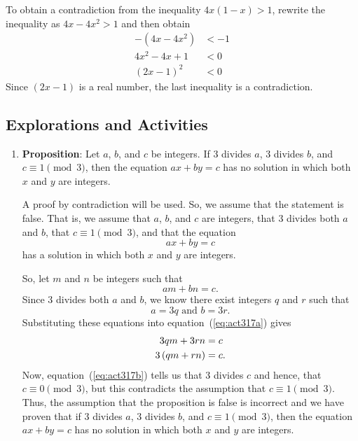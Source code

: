 \begin{enumerate}
\begin{enumerate}
\newpar
To obtain a contradiction from the inequality $4x(1 - x) > 1$, rewrite the inequality as $4x - 4x^2 > 1$ and then obtain
\begin{align*}
-\left( 4x - 4x^2 \right) &< -1 \\
4x^2 - 4x + 1 &< 0 \\
(2x - 1)^2 &< 0
\end{align*}
Since $(2x - 1)$ is a real number, the last inequality is a contradiction.
\end{enumerate}
\end{enumerate}


\subsection*{Explorations and Activities}
\setcounter{oldenumi}{\theenumi}
\begin{enumerate} \setcounter{enumi}{\theoldenumi}
\item \textbf{Proposition}: Let  $a$, $b$, and $c$  be integers.  If  3  divides  $a$,  3  divides  $b$,  and  $c \equiv 1 \pmod 3$, then the equation $ax + by = c$ has no solution in which both  $x$  and  $y$  are integers.

\begin{myproof}
A proof by contradiction will be used.  So, we assume that the statement is false.  That is, we assume that $a$, $b$, and $c$ are integers, that  3  divides both  $a$  and  $b$, that  $c \equiv 1 \pmod 3$,  and that  the equation
\[
ax + by = c
\]
has a solution in which both  $x$  and  $y$  are integers.

So, let  $m$  and  $n$  be integers  such that 
\setcounter{equation}{0}
\begin{equation} \label{eq:act317a}
am  + bn  = c.
\end{equation}
Since  3  divides both  $a$  and  $b$, we know there exist integers  $q$  and  $r$  such that
\[
a = 3q\text{  and  }b = 3r.
\]
Substituting these equations into equation~(\ref{eq:act317a}) gives
\begin{align} 
  3qm + 3rn &= c \notag \\ 
  3\left( {qm + rn} \right) &= c.  \label{eq:act317b}
\end{align}
Now, equation~(\ref{eq:act317b}) tells us that  3  divides  $c$ and hence, that  
$c \equiv 0 \pmod 3$, but this contradicts the assumption that  $c \equiv 1 \pmod 3$.  Thus, the assumption that the proposition is false is incorrect and we have proven that if  3  divides  $a$,  3  divides  $b$,  and  $c \equiv 1 \pmod 3$, then the equation $ax + by = c$  has no solution in which both  $x$  and  $y$  are integers.
\end{myproof}




\end{enumerate}
